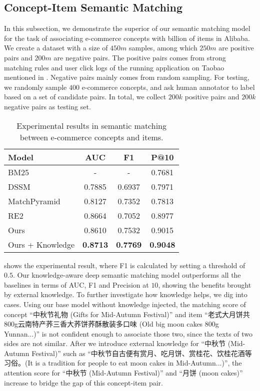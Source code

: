 
\subsection{Concept-Item Semantic Matching}


In this subsection,
we demonstrate the superior of our semantic matching model
for the task of associating e-commerce concepts with billion of items in Alibaba.
We create a dataset with a size of $450m$ samples, among which $250m$ are positive pairs and $200m$ are negative pairs.
The positive pairs comes from strong matching rules and user click logs of the running application on Taobao mentioned in .
Negative pairs mainly comes from random sampling.
For testing, we randomly sample $400$ e-commerce concepts,
and ask human annotator to label based on a set of candidate pairs.
In total, we collect $200k$ positive pairs and $200k$ negative pairs as testing set.

\begin{table}[th]
	\centering
	\begin{tabular}{l|c|c|c}
		\hline
		Model & AUC & F1 & P@10   \\
		\hline
		BM25 & - & - & 0.7681 \\
		DSSM \cite{huang2013learning}  & 0.7885 & 0.6937 & 0.7971  \\
		MatchPyramid \cite{pang2016text} & 0.8127 & 0.7352 & 0.7813  \\
		RE2 \cite{yang2019simple} \ & 0.8664 & 0.7052 & 0.8977  \\
		\hline
		Ours & 0.8610 & 0.7532 & 0.9015  \\
		Ours + Knowledge & \textbf{0.8713} & \textbf{0.7769} & \textbf{0.9048}  \\
		\hline 
	\end{tabular}
	\caption{Experimental results in semantic matching between e-commerce concepts and items.}
	\label{tab:matching}
\end{table}

 shows the experimental result, 
where F1 is calculated by setting a threshold of $0.5$.
Our knowledge-aware deep semantic matching model outperforms all the baselines in terms of AUC, F1 and Precision at $10$,
showing the benefits brought by external knowledge.
To further investigate how knowledge helps, 
we dig into cases. Using our base model without knowledge injected,
the matching score of concept ``中秋节礼物 (Gifts for Mid-Autumn Festival)'' and item ``老式大月饼共800g云南特产荞三香大荞饼荞酥散装多口味 (Old big moon cakes 800g Yunnan...)'' is not confident enough to associate those two, since the texts of two sides are not similar.
After we introduce external knowledge for ``中秋节 (Mid-Autumn Festival)'' such as ``中秋节自古便有赏月、吃月饼、赏桂花、饮桂花酒等习俗。(It is a tradition for people to eat moon cakes in Mid-Autumn...)'', 
the attention score for ``中秋节 (Mid-Autumn Festival)'' and ``月饼 (moon cakes)'' increase to bridge the gap of this concept-item pair.
  
